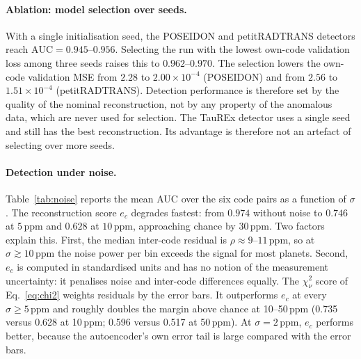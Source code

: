 \paragraph{Ablation: model selection over seeds.}
With a single initialisation seed, the POSEIDON and petitRADTRANS detectors reach $\mathrm{AUC}=0.945$--$0.956$.
Selecting the run with the lowest own-code validation loss among three seeds raises this to $0.962$--$0.970$.
The selection lowers the own-code validation MSE from $2.28$ to $2.00\times10^{-4}$ (POSEIDON) and from $2.56$ to $1.51\times10^{-4}$ (petitRADTRANS).
Detection performance is therefore set by the quality of the nominal reconstruction, not by any property of the anomalous data, which are never used for selection.
The TauREx detector uses a single seed and still has the best reconstruction.
Its advantage is therefore not an artefact of selecting over more seeds.

\paragraph{Detection under noise.}
Table~\ref{tab:noise} reports the mean AUC over the six code pairs as a function of $\sigma$.
The reconstruction score $e_c$ degrades fastest: from $0.974$ without noise to $0.746$ at $5\,\mathrm{ppm}$ and $0.628$ at $10\,\mathrm{ppm}$, approaching chance by $30\,\mathrm{ppm}$.
Two factors explain this.
First, the median inter-code residual is $\rho\approx9$--$11\,\mathrm{ppm}$, so at $\sigma\gtrsim10\,\mathrm{ppm}$ the noise power per bin exceeds the signal for most planets.
Second, $e_c$ is computed in standardised units and has no notion of the measurement uncertainty: it penalises noise and inter-code differences equally.
The $\chi^2_\nu$ score of Eq.~\eqref{eq:chi2} weights residuals by the error bars.
It outperforms $e_c$ at every $\sigma\geq5\,\mathrm{ppm}$ and roughly doubles the margin above chance at 10--50\,ppm (0.735 versus 0.628 at 10\,ppm; 0.596 versus 0.517 at 50\,ppm).
At $\sigma=2\,\mathrm{ppm}$, $e_c$ performs better, because the autoencoder's own error tail is large compared with the error bars.

